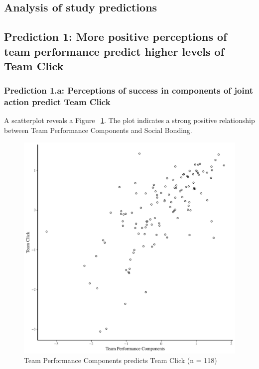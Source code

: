 \begin{CJK}{UTF8}{gbsn}
\section{Analysis of study predictions}


\subsection{Prediction 1: More positive perceptions of team performance predict higher levels of Team Click}

\subsubsection{Prediction 1.a: Perceptions of success in components of joint action predict Team Click}




A scatterplot reveals a Figure ~\ref{fig:jasClickBasicXY}. The plot indicates a strong positive relationship between Team Performance Components and Social Bonding.

\begin{figure}[htbp]
  \centering
\includegraphics[scale=.5]{images/jasClickBasicXY.pdf}
  \caption{Team Performance Components predicts Team Click (n = 118)}
  \label{fig:jasClickBasicXY}
\end{figure}



\end{CJK}
